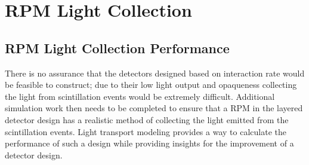 
\chapter{RPM Light Collection}
\label{chap:LightTransport}
\section{RPM Light Collection Performance}
\label{sec:RPMLCP}

There is no assurance that the detectors designed based on interaction rate would be feasible to construct; due to their low light output and opaqueness collecting the light from scintillation events would be extremely difficult.  
Additional simulation work then needs to be completed to ensure that a RPM in the layered detector design has a realistic method of collecting the light emitted from the scintillation events.
Light transport modeling provides a way to calculate the performance of such a design while providing insights for the improvement of a detector design.


